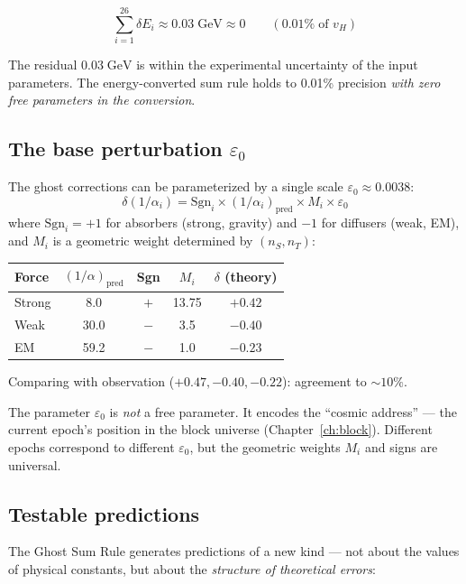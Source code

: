 \begin{equation}
\boxed{\sum_{i=1}^{26} \delta E_i \approx 0.03\;\text{GeV} \approx 0 \qquad (0.01\%\;\text{of } v_H)}
\end{equation}

The residual $0.03\;\text{GeV}$ is within the experimental uncertainty of the input parameters. The energy-converted sum rule holds to 0.01\% precision \emph{with zero free parameters in the conversion}.

\subsection{The base perturbation $\varepsilon_0$}

The ghost corrections can be parameterized by a single scale $\varepsilon_0 \approx 0.0038$:
\begin{equation}
\delta(1/\alpha_i) = \text{Sgn}_i \times (1/\alpha_i)_\text{pred} \times M_i \times \varepsilon_0
\end{equation}
where $\text{Sgn}_i = +1$ for absorbers (strong, gravity) and $-1$ for diffusers (weak, EM), and $M_i$ is a geometric weight determined by $(n_S, n_T)$:

\begin{center}
\begin{tabular}{lcccc}
\hline
Force & $(1/\alpha)_\text{pred}$ & Sgn & $M_i$ & $\delta$ (theory) \\
\hline
Strong & 8.0 & $+$ & 13.75 & $+0.42$ \\
Weak & 30.0 & $-$ & 3.5 & $-0.40$ \\
EM & 59.2 & $-$ & 1.0 & $-0.23$ \\
\hline
\end{tabular}
\end{center}

Comparing with observation ($+0.47, -0.40, -0.22$): agreement to $\sim 10\%$.

The parameter $\varepsilon_0$ is \emph{not} a free parameter. It encodes the ``cosmic address'' --- the current epoch's position in the block universe (Chapter~\ref{ch:block}). Different epochs correspond to different $\varepsilon_0$, but the geometric weights $M_i$ and signs are universal.

\subsection{Testable predictions}

The Ghost Sum Rule generates predictions of a new kind --- not about the values of physical constants, but about the \emph{structure of theoretical errors}:

